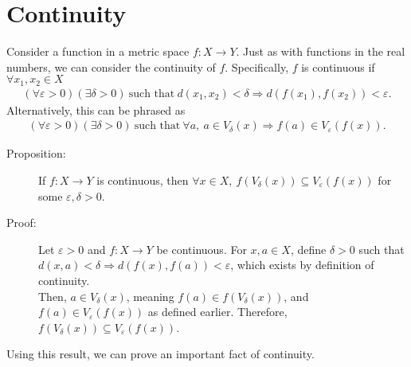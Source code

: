 \documentclass[12pt]{extarticle}
\begin{document}
  \section*{Continuity}%
  Consider a function in a metric space $f: X\rightarrow Y$. Just as with functions in the real numbers, we can consider the continuity of $f$.\supercite{lay} Specifically, $f$ is continuous if $\forall x_1,x_2\in X$
  \begin{align*}
    \left(\forall \varepsilon > 0\right)\left(\exists \delta > 0\right)~\text{such that}~d(x_1,x_2) < \delta \Rightarrow d(f(x_1),f(x_2))<\varepsilon.
  \end{align*}
  Alternatively, this can be phrased as
  \begin{align*}
    \left(\forall \varepsilon > 0\right)\left(\exists \delta > 0\right)~\text{such that}~\forall a,~a\in V_{\delta}(x) \Rightarrow f(a)\in V_{\varepsilon}(f(x)).
  \end{align*}
  \begin{description}
    \item[Proposition:] If $f:X\rightarrow Y$ is continuous, then $\forall x\in X,~f(V_{\delta}(x)) \subseteq V_{\varepsilon}(f(x))$ for some $\varepsilon,\delta > 0$.
    \item[Proof:] Let $\varepsilon > 0$ and $f: X\rightarrow Y$ be continuous. For $x,a\in X$, define $\delta > 0$ such that $d(x,a) < \delta \Rightarrow d(f(x),f(a)) < \varepsilon$, which exists by definition of continuity.\\

      Then, $a\in V_{\delta}(x)$, meaning $f(a)\in f(V_{\delta}(x))$, and $f(a)\in V_{\varepsilon}(f(x))$ as defined earlier. Therefore, $f(V_{\delta}(x))\subseteq V_{\varepsilon}(f(x))$.
  \end{description}
  Using this result, we can prove an important fact of continuity.
\end{document}
